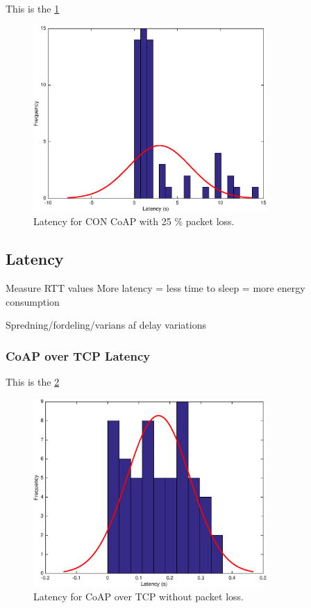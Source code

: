 This is the \figurename \ref{coapoverudploss}
\begin{figure}[bh]
	\centering
	\includegraphics[width=3.5in]{gfx/coapoverudp25loss}
	\caption{Latency for CON CoAP with 25 \% packet loss.}
	\label{coapoverudploss}
\end{figure}


\subsection{Latency}
Measure RTT values %
More latency = less time to sleep = more energy consumption

Spredning/fordeling/varians af delay variations 

\subsubsection{CoAP over TCP Latency}
This is the \figurename \ref{fig_sim}
\begin{figure}[bh]
\centering
\includegraphics[width=3.5in]{gfx/coapovertcp}
\caption{Latency for CoAP over TCP without packet loss.}
\label{fig_sim}
\end{figure}

